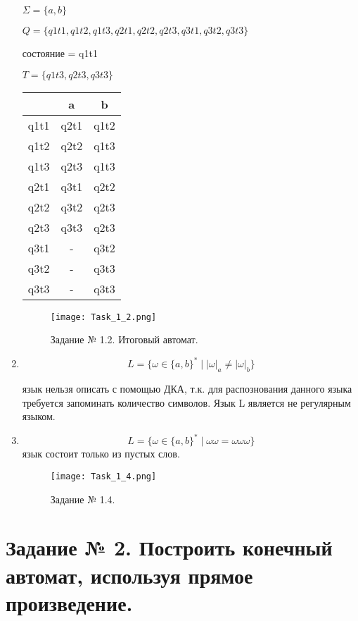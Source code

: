 \documentclass[a4paper, 12pt]{article}
\begin{document}
\begin{enumerate}
\noindent$ \Sigma = \{a, b\}$

\noindent$ Q = \{q1t1, q1t2, q1t3, q2t1, q2t2, q2t3, q3t1, q3t2, q3t3 \} $

 состояние = q1t1

\noindent$ T = \{q1t3, q2t3, q3t3 \} $

\begin{center}
\begin{tabular}{ |c|c|c| } 
\hline
\, & a & b \\
\hline
 q1t1 & q2t1 & q1t2 \\
\hline
q1t2 & q2t2 & q1t3 \\
\hline
q1t3& q2t3 & q1t3 \\
\hline
q2t1 & q3t1 & q2t2 \\
\hline
q2t2 & q3t2 & q2t3 \\
\hline
q2t3 & q3t3 & q2t3 \\
\hline
q3t1 & - & q3t2 \\
\hline
q3t2 & - & q3t3 \\
\hline
q3t3 & - & q3t3 \\
\hline
\end{tabular}
\end{center}

\begin{figure}[!h]
\centering
\texttt{[image: Task\_1\_2.png]}
\caption{Задание № 1.2. Итоговый автомат.}
\end{figure}

\item$$ L = \{\omega \in \{a, b\}^* \mid |\omega|_a \neq |\omega|_b \} $$

 язык нельзя описать с помощью ДКА, т.к. для распознования данного языка требуется запоминать количество символов. Язык L является не регулярным языком.

\item$$ L = \{\omega \in \{a, b\}^* \mid \omega\omega = \omega\omega\omega \} $$
 язык состоит только из пустых слов.
\begin{figure}[!h]
\centering
\texttt{[image: Task\_1\_4.png]}
\caption{Задание № 1.4.}
\end{figure}

\end{enumerate}

\section{Задание № 2. Построить конечный автомат, используя прямое произведение.}
\end{document}
